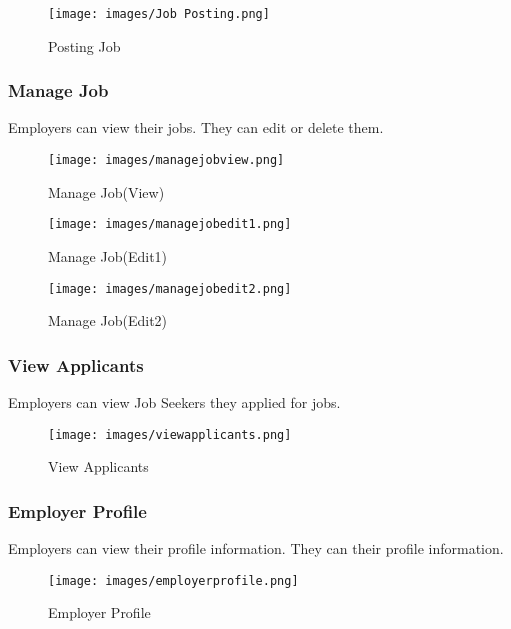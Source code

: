 \documentclass[a4paper,12pt]{article}
\begin{document}
\begin{figure}[h!]
    \centering
    \texttt{[image: images/Job Posting.png]} 
    \caption{Posting Job}
    \label{fig:postingJob}
\end{figure}

\newpage

\subsubsection{Manage Job}
Employers can view their jobs. They can edit or delete them.

\begin{figure}[h!]
    \centering
    \texttt{[image: images/managejobview.png]} 
    \caption{Manage Job(View)}
    \label{fig:manageJob(view)}
\end{figure}

\begin{figure}[h!]
    \centering
    \texttt{[image: images/managejobedit1.png]} 
    \caption{Manage Job(Edit1)}
    \label{fig:manageJob(edit1)}
\end{figure}

\newpage

\begin{figure}[h!]
    \centering
    \texttt{[image: images/managejobedit2.png]}
    \caption{Manage Job(Edit2)}
    \label{fig:manageJob(edit2)}
\end{figure}

\subsubsection{View Applicants}
Employers can view Job Seekers they applied for jobs.


\begin{figure}[h!]
    \centering
    \texttt{[image: images/viewapplicants.png]} 
    \caption{View Applicants}
    \label{fig:viewApplicants}
\end{figure}

\newpage
\subsubsection{Employer Profile}
Employers can view their profile information. They can their profile information.

\begin{figure}[h!]
    \centering
    \texttt{[image: images/employerprofile.png]} 
    \caption{Employer Profile}
    \label{fig:employer_profile}
\end{figure}
\end{document}
